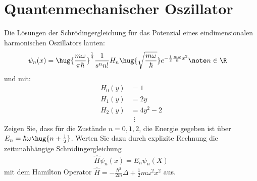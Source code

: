 \documentclass[ex]{exercise}
\begin{document}
\section{Quantenmechanischer Oszillator}
Die Lösungen der Schrödingergleichung für das Potenzial eines eindimensionalen 
harmonischen Oszillators lauten:
\begin{align*}
    \psi_n(x) &= \hug{\frac{m\omega}{\pi\hbar}}^{\frac14} \frac1{s^n n!} H_n\hug{\sqrt{\frac{m\omega}{\hbar}}} e^{-\frac12 \frac{m\omega}{\hbar}x^2} \note n\in \R
\end{align*}
und mit:
\begin{align*}
    H_0(y) &= 1\\
    H_1(y) &= 2y\\
    H_2(y) &= 4y^2-2\\
    &\ \ \vdots
\end{align*}
Zeigen Sie, dass für die Zustände \(n=0,1,2\), die Energie gegeben ist über \(E_n=\hbar\omega \hug{n+\frac12}\).
Werten Sie dazu durch explizite Rechnung die zeitunabhängige Schrödingergleichung 
\begin{align*}
    \hat H \psi_n (x) = E_n\psi_n (X)
\end{align*}
mit dem Hamilton Operator \(\hat H=-\frac{\hbar^2}{2m} \Delta + \frac12 m\omega^2 x^2\) aus.

\dottedlinete
\end{document}
